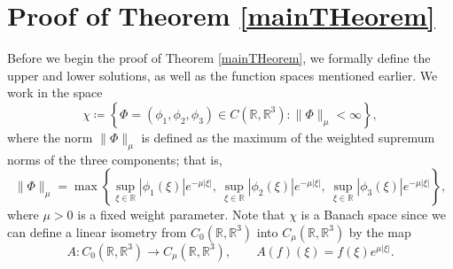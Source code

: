 \documentclass[11pt]{article}
\theoremstyle{definition}
\begin{document}
{\color{black}

\section{Proof of Theorem \ref{mainTHeorem}}\label{sec:proof}
Before we begin the proof of Theorem \ref{mainTHeorem}, we formally define the upper and lower solutions, as well as the function spaces mentioned earlier.  
We work in the space
\[
    \chi \coloneqq \left\{ \Phi = (\phi_1, \phi_2, \phi_3) \in C(\mathbb{R},\mathbb{R}^3) : \|\Phi\|_{\mu} < \infty \right\},
\]
where the norm $\|\Phi\|_{\mu}$ is defined as the maximum of the weighted supremum norms of the three components; that is,
\begin{equation}\label{norm_definition}
    \|\Phi\|_{\mu}
    = 
    \max \left\{
        \sup_{\xi \in \mathbb{R}} |\phi_1(\xi)| e^{-\mu |\xi|},
        \ \sup_{\xi \in \mathbb{R}} |\phi_2(\xi)| e^{-\mu |\xi|},
        \ \sup_{\xi \in \mathbb{R}} |\phi_3(\xi)| e^{-\mu |\xi|}
    \right\},
\end{equation}
where $\mu>0$ is a fixed weight parameter.
 Note that $\chi$ is a Banach space since we can define a linear isometry from $C_0(\mathbb{R},\mathbb{R}^3)$ into $C_{\mu}(\mathbb{R},\mathbb{R}^3)$ by the map
\[
A: C_0(\mathbb{R},\mathbb{R}^3) \to C_{\mu}(\mathbb{R},\mathbb{R}^3), 
\qquad 
A(f)(\xi) = f(\xi)e^{\mu |\xi|}.
\]

}
\end{document}
